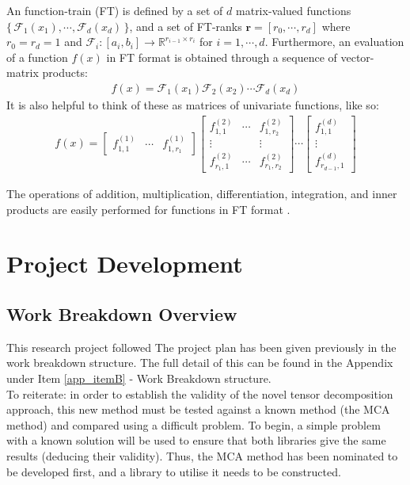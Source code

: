 \documentclass[11pt,draftd]{article}
\begin{document}
An function-train (FT) is defined by a set of $ d $ matrix-valued functions $ \{\, \mathcal{F}_{1}(x_{1}),\cdots,\mathcal{F}_{d}(x_{d}) \,\} $, and a set of FT-ranks $ \bm{r} = [r_{0},\cdots,r_{d}] $ where $ r_{0} = r_{d} = 1 $ and $ \mathcal{F}_{i} : [a_{i}, b_{i}] \rightarrow \mathbb{R}^{r_{i-1}\times r_{i}} $ for $ i = 1, \cdots, d $. Furthermore, an evaluation of a function $ f (x) $ in FT format is obtained through a sequence of vector-matrix products:
\begin{align*}
	f(x) = \mathcal{F}_{1}(x_{1})\mathcal{F}_{2}(x_{2}) \cdots \mathcal{F}_{d}(x_{d}) 
\end{align*}
It is also helpful to think of these as matrices of univariate functions, like so:
\begin{align}
	f(x) = \begin{bmatrix}
	f_{1,1}^{(1)} & \cdots & f_{1,r_{1}}^{(1)}
	\end{bmatrix}
	\begin{bmatrix}
	f_{1,1}^{(2)} & \cdots & f_{1,r_{2}}^{(2)} \\
	\vdots & & \vdots \\
	f_{r_{1},1}^{(2)} & \cdots & f_{r_{1},r_{2}}^{(2)}
	\end{bmatrix} 
	\cdots
	\begin{bmatrix}
	f_{1,1}^{(d)} \\
	\vdots \\
	f_{r_{d-1},1}^{(d)}
	\end{bmatrix}
\end{align}

The operations of addition, multiplication, differentiation, integration, and inner products are easily performed for functions in FT format \cite{thesis}. 
\newpage

\section{Project Development} \label{ProjectProgress}
\subsection{Work Breakdown Overview}
This research project followed 
The project plan has been given previously in the work breakdown structure. The full detail of this can be found in the Appendix under Item \ref{app_itemB} - Work Breakdown structure. \\

\noindent To reiterate: in order to establish the validity of the novel tensor decomposition approach, this new method must be tested against a known method (the MCA method) and compared using a difficult problem. To begin, a simple problem with a known solution will be used to ensure that both libraries give the same results (deducing their validity). Thus, the MCA method has been nominated to be developed first, and a library to utilise it needs to be constructed. \\
\end{document}
